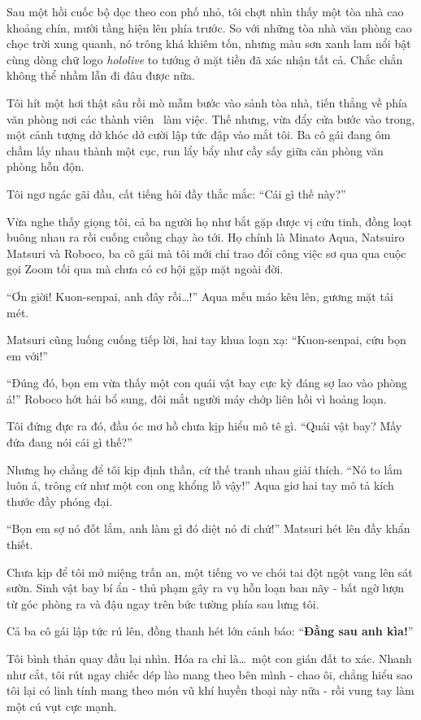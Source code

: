 \documentclass[../main.tex]{subfiles}
\begin{document}
Sau một hồi cuốc bộ dọc theo con phố nhỏ, tôi chợt nhìn thấy một tòa nhà cao khoảng chín, mười tầng hiện lên phía trước. So với những tòa nhà văn phòng cao chọc trời xung quanh, nó trông khá khiêm tốn, nhưng màu sơn xanh lam nổi bật cùng dòng chữ logo \textit{hololive} to tướng ở mặt tiền đã xác nhận tất cả. Chắc chắn không thể nhầm lẫn đi đâu được nữa.

\ct

Tôi hít một hơi thật sâu rồi mò mẫm bước vào sảnh tòa nhà, tiến thẳng về phía văn phòng nơi các thành viên \hll\ làm việc. Thế nhưng, vừa đẩy cửa bước vào trong, một cảnh tượng dở khóc dở cười lập tức đập vào mắt tôi. Ba cô gái đang ôm chầm lấy nhau thành một cục, run lẩy bẩy như cầy sấy giữa căn phòng văn phòng hỗn độn.

Tôi ngơ ngác gãi đầu, cất tiếng hỏi đầy thắc mắc: ``Cái gì thế này?''

Vừa nghe thấy giọng tôi, cả ba người họ như bắt gặp được vị cứu tinh, đồng loạt buông nhau ra rồi cuống cuồng chạy ào tới. Họ chính là Minato Aqua, Natsuiro Matsuri và Roboco, ba cô gái mà tôi mới chỉ trao đổi công việc sơ qua qua cuộc gọi Zoom tối qua mà chưa có cơ hội gặp mặt ngoài đời.

``Ơn giời! Kuon-senpai, anh đây rồi\dots!'' Aqua mếu máo kêu lên, gương mặt tái mét.

Matsuri cũng luống cuống tiếp lời, hai tay khua loạn xạ: ``Kuon-senpai, cứu bọn em với!''

``Đúng đó, bọn em vừa thấy một con quái vật bay cực kỳ đáng sợ lao vào phòng á!'' Roboco hớt hải bổ sung, đôi mắt người máy chớp liên hồi vì hoảng loạn.

Tôi đứng đực ra đó, đầu óc mơ hồ chưa kịp hiểu mô tê gì. ``Quái vật bay? Mấy đứa đang nói cái gì thế?''

Nhưng họ chẳng để tôi kịp định thần, cứ thế tranh nhau giải thích. ``Nó to lắm luôn á, trông cứ như một con ong khổng lồ vậy!'' Aqua giơ hai tay mô tả kích thước đầy phóng đại.

``Bọn em sợ nó đốt lắm, anh làm gì đó diệt nó đi chứ!'' Matsuri hét lên đầy khẩn thiết.

Chưa kịp để tôi mở miệng trấn an, một tiếng vo ve chói tai đột ngột vang lên sát sườn. Sinh vật bay bí ẩn - thủ phạm gây ra vụ hỗn loạn ban nãy - bất ngờ lượn từ góc phòng ra và đậu ngay trên bức tường phía sau lưng tôi.

Cả ba cô gái lập tức rú lên, đồng thanh hét lớn cảnh báo: ``\textbf{Đằng sau anh kìa!}''

Tôi bình thản quay đầu lại nhìn. Hóa ra chỉ là\dots\ một con gián đất to xác. Nhanh như cắt, tôi rút ngay chiếc dép lào mang theo bên mình - chao ôi, chẳng hiểu sao tôi lại có linh tính mang theo món vũ khí huyền thoại này nữa - rồi vung tay làm một cú vụt cực mạnh.
\end{document}
